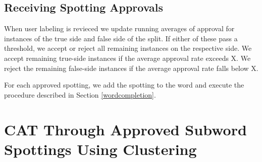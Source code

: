 \documentclass[ms,electronic,twosidetoc,letterpaper,chaptercenter,parttop,lof,lot]{byumsphd}
\begin{document}
%
%

\subsection{Receiving Spotting Approvals}

When user labeling is revieced we update running averages of approval for instances of the true side and false side of the split. If either of these pass a threshold, we accept or reject all remaining instances on the respective side. We accept remaining true-side instances if the average approval rate exceeds X. We reject the remaining false-side instances if the average approval rate falls below X.

For each approved spotting, we add the spotting to the word and execute the procedure described in Section \ref{wordcompletion}.










\section{CAT Through Approved Subword Spottings Using Clustering}
\end{document}

